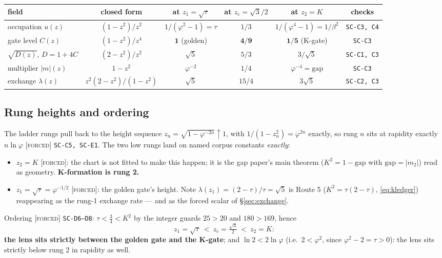 \documentclass[11pt]{article}
\newcommand{\tagF}{\textcolor{cF}{\textsc{[forced]}}}
\newcommand{\hx}[1]{\textcolor{cC}{\footnotesize\texttt{#1}}}
\newcommand{\gp}{\varphi}
\newcommand{\gapc}{\mathrm{gap}}
\theoremstyle{plain}
\theoremstyle{definition}
\theoremstyle{remark}
\begin{document}
\begin{center}
\footnotesize\setlength{\tabcolsep}{3.5pt}
\begin{tabular}{@{}lccccc@{}}
\toprule
field & closed form & at $z_1=\sqrt\tau$ & at $z_c=\sqrt3/2$ & at $z_2=K$ & checks\\
\midrule
occupation $u(z)$ & $(1-z^2)/z^2$ & $1/(\gp^2-1)=\tau$ & $1/3$ & $1/(\gp^4-1)=1/\beta^2$ & \hx{SC-C3, C4}\\
gate level $C(z)$ & $(1-z^2)/z^4$ & $\mathbf{1}$ (golden) & $\mathbf{4/9}$ & $\mathbf{1/5}$ (K-gate) & \hx{SC-C3}\\
$\sqrt{D(z)}$, $D=1+4C$ & $(2-z^2)/z^2$ & $\sqrt5$ & $5/3$ & $3/\sqrt5$ & \hx{SC-C1, C3}\\
multiplier $|m|(z)$ & $1-z^2$ & $\gp^{-2}$ & $1/4$ & $\gp^{-4}=\gapc$ & \hx{SC-C3}\\
exchange $\lambda(z)$ & $z^2(2-z^2)/(1-z^2)$ & $\sqrt5$ & $15/4$ & $3\sqrt5$ & \hx{SC-C2, C3}\\
\bottomrule
\end{tabular}
\end{center}

\subsection{Rung heights and ordering}\label{sec:rungs}
The ladder rungs pull back to the height sequence
$z_n=\sqrt{1-\gp^{-2n}}\uparrow1$, with $1/(1-z_n^2)=\gp^{2n}$ exactly, so rung $n$
sits at rapidity exactly $n\ln\gp$ \tagF{} \hx{SC-C5, SC-E1}. The two low rungs land
on named corpus constants \emph{exactly}:
\begin{itemize}[nosep]
\item $z_2=K$ \tagF{}: the chart is not fitted to make this happen; it is the gap
paper's main theorem ($K^2=1-\gapc$ with $\gapc=|m_2|$) read as geometry.
\textbf{K-formation is rung 2.}
\item $z_1=\sqrt\tau=\gp^{-1/2}$ \tagF{}: the golden gate's height. Note
$\lambda(z_1)=(2-\tau)/\tau=\sqrt5$ is Route 5 ($K^2=\tau(2-\tau)$,
\eqref{eq:kledger}) reappearing as the rung-1 exchange rate --- and as the forced
scalar of \S\ref{sec:exchange}.
\end{itemize}
Ordering \tagF{} \hx{SC-D6--D8}: $\tau<\tfrac34<K^2$ by the integer guards $25>20$
and $180>169$, hence
\[
z_1=\sqrt\tau\ <\ z_c=\tfrac{\sqrt3}{2}\ <\ z_2=K :
\]
\textbf{the lens sits strictly between the golden gate and the K-gate}; and
$\ln2<2\ln\gp$ (i.e.\ $2<\gp^2$, since $\gp^2-2=\tau>0$): the lens sits strictly
below rung 2 in rapidity as well.
\end{document}
